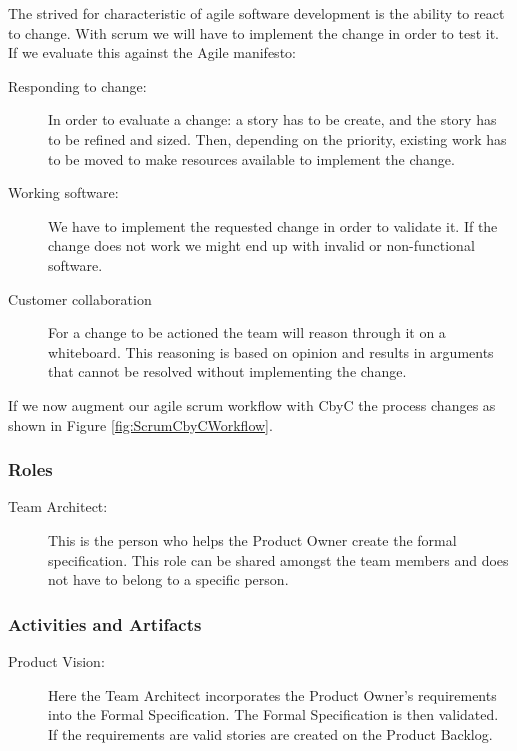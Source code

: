 The strived for characteristic of agile software development is the ability to 
react to change. With scrum we will have to implement the change in order to test
it. If we evaluate this against the Agile manifesto:
\begin{description}
	\item [Responding to change:]  In order to evaluate a change: a story has to be
		create, and the story has to be refined and sized. Then, depending on the 
		priority, existing work has to be moved to make resources available to implement
		the change. 
	\item [Working software:] We have to implement the requested change in order to
		validate it. If the change does not work we might end up with invalid or
		non-functional software.
	\item [Customer collaboration] For a change to be actioned the team will reason
		through it on a whiteboard. This reasoning is based on opinion and results in
		arguments that cannot be resolved without implementing the change.
\end{description}

If we now augment our agile scrum workflow with CbyC the process changes as shown in  Figure \ref{fig:ScrumCbyCWorkflow}.

\subsubsection{Roles}
\begin{description}
	\item [Team Architect:] This is the person who helps the Product Owner create 
		the formal specification. This role can be shared amongst the team members and 
		does not have to belong to a specific person.
\end{description}

\subsubsection{Activities and Artifacts}
\begin{description}
	\item [Product Vision:] Here the Team Architect incorporates the Product Owner's
		requirements into the Formal Specification. The Formal Specification is then 
		validated. If the requirements are valid stories are created on the Product
		Backlog.
\end{description}

